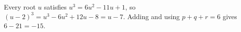 Every root $u$ satisfies $u^3=6u^2-11u+1$, so $(u-2)^3=u^3-6u^2+12u-8=u-7$. Adding and using $p+q+r=6$ gives $6-21=\boxed{-15}$.
